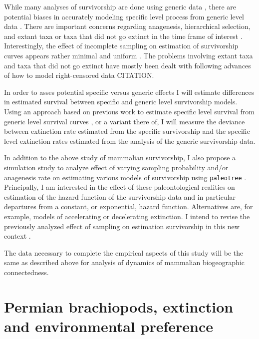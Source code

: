 \documentclass[12pt,letterpaper]{article}
\begin{document}

While many analyses of survivorship are done using generic data \citep{Tomiya2013,Liow2008,Harnik2013}, there are potential biases in accurately modeling specific level process from generic level data \citep{Raup1975,Sepkoski1975,Simpson2006,Raup1991a,VanValen1979}. There are important concerns regarding anagenesis, hierarchical selection, and extant taxa or taxa that did not go extinct in the time frame of interest \citep{Raup1975,VanValen1979,Simpson2006,Raup1991a}. Interestingly, the effect of incomplete sampling on estimation of survivorship curves appears rather minimal and uniform \citep{Sepkoski1975}. The problems involving extant taxa and taxa that did not go extinct have mostly been dealt with following advances of how to model right-censored data CITATION. 

In order to asses potential specific versus generic effects I will estimate differences in estimated survival between specific and generic level survivorship models. Using an approach based on previous work to estimate specific level survival from generic level survival curves \citep{Foote1988}, or a variant there of, I will measure the deviance between extinction rate estimated from the specific survivorship and the specific level extinction rates estimated from the analysis of the generic survivorship data. 

In addition to the above study of mammalian survivorship, I also propose a simulation study to analyze effect of varying sampling probability and/or anagenesis rate on estimating various models of survivorship using \texttt{paleotree} \citep{Bapst2012a}. Principally, I am interested in the effect of these paleontological realities on estimation of the hazard function of the survivorship data and in particular departures from a constant, or exponential, hazard function. Alternatives are, for example, models of accelerating or decelerating extinction. I intend to revise the previously analyzed effect of sampling on estimation survivorship in this new context \citep{Sepkoski1975}.

The data necessary to complete the empirical aspects of this study will be the same as described above for analysis of dynamics of mammalian biogeographic connectedness.


\section{Permian brachiopods, extinction and environmental preference}
\end{document}
